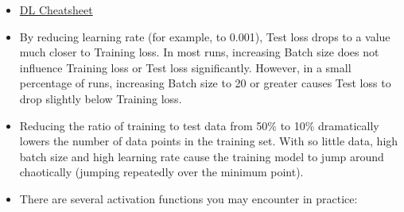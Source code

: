 \documentclass[]{book}
\theoremstyle{definition}
\theoremstyle{definition}
\theoremstyle{definition}
\theoremstyle{remark}
\begin{document}
\begin{itemize}
\item
  \href{https://hackernoon.com/deep-learning-cheat-sheet-25421411e460}{DL
  Cheatsheet}
\item
  By reducing learning rate (for example, to 0.001), Test loss drops to
  a value much closer to Training loss. In most runs, increasing Batch
  size does not influence Training loss or Test loss significantly.
  However, in a small percentage of runs, increasing Batch size to 20 or
  greater causes Test loss to drop slightly below Training loss.
\item
  Reducing the ratio of training to test data from 50\% to 10\%
  dramatically lowers the number of data points in the training set.
  With so little data, high batch size and high learning rate cause the
  training model to jump around chaotically (jumping repeatedly over the
  minimum point).
\item
  There are several activation functions you may encounter in practice:


\end{itemize}
\end{document}
